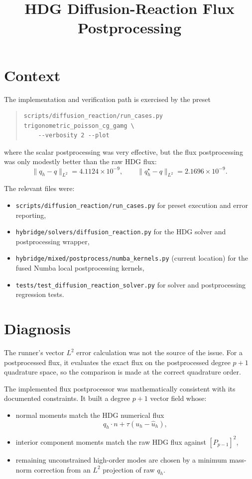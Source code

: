 \documentclass[11pt]{article}
\title{HDG Diffusion-Reaction Flux Postprocessing}
\author{}
\date{}
\begin{document}
\maketitle

\section{Context}

The implementation and verification path is exercised by the preset
\begin{quote}
\small
\begin{verbatim}
scripts/diffusion_reaction/run_cases.py trigonometric_poisson_cg_gamg \
    --verbosity 2 --plot
\end{verbatim}
\end{quote}
where the scalar postprocessing was very effective, but the flux postprocessing
was only modestly better than the raw HDG flux:
\[
\|q_h - q\|_{L^2} = 4.1124 \times 10^{-9}, \qquad
\|q_h^\star - q\|_{L^2} = 2.1696 \times 10^{-9}.
\]

The relevant files were:
\begin{itemize}
    \item \verb|scripts/diffusion_reaction/run_cases.py| for preset execution and error reporting,
    \item \verb|hybridge/solvers/diffusion_reaction.py| for the HDG solver and postprocessing wrapper,
    \item \verb|hybridge/mixed/postprocess/numba_kernels.py| (current location) for the fused Numba local postprocessing kernels,
    \item \verb|tests/test_diffusion_reaction_solver.py| for solver and postprocessing regression tests.
\end{itemize}

\section{Diagnosis}

The runner's vector $L^2$ error calculation was not the source of the issue.
For a postprocessed flux, it evaluates the exact flux on the postprocessed
degree $p+1$ quadrature space, so the comparison is made at the correct
quadrature order.

The implemented flux postprocessor was mathematically consistent with its
documented constraints. It built a degree $p+1$ vector field whose:
\begin{itemize}
    \item normal moments match the HDG numerical flux
    \[
    q_h \cdot n + \tau (u_h - \widehat{u}_h),
    \]
    \item interior component moments match the raw HDG flux against
    $[P_{p-1}]^2$,
    \item remaining unconstrained high-order modes are chosen by a minimum
    mass-norm correction from an $L^2$ projection of raw $q_h$.
\end{itemize}
\end{document}

